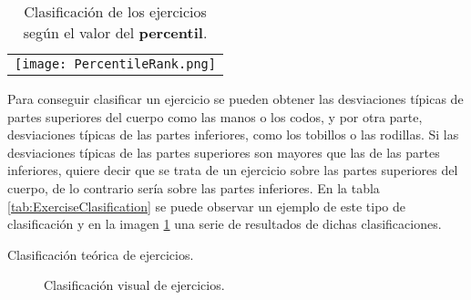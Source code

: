 \begin{table}[H]
    \centering
    \begin{tabular}{}
    \texttt{[image: PercentileRank.png]}
    \end{tabular}
    \caption{Clasificación de los ejercicios según el valor del \textbf{percentil}.}
    \label{tab:PercentileRank}
\end{table}

 Para conseguir clasificar un ejercicio se pueden obtener las desviaciones típicas de partes superiores del cuerpo como las manos o los codos, y por otra parte, desviaciones típicas de las partes inferiores, como los tobillos o las rodillas. Si las desviaciones típicas de las partes superiores son mayores que las de las partes inferiores, quiere decir que se trata de un ejercicio sobre las partes superiores del cuerpo, de lo contrario sería sobre las partes inferiores. En la tabla \ref{tab:ExerciseClasification} se puede observar un ejemplo de este tipo de clasificación y en la imagen \ref{f:prub} una serie de resultados de dichas clasificaciones.

\begin{table}[H]
 \centering
 \caption{Clasificación teórica de ejercicios.}
 \label{tab:ExerciseClasification}
\end{table}

\begin{figure}
 \centering
{}
      \vspace{1mm}
      \vspace{1mm}
 \caption{Clasificación visual de ejercicios.}
 \label{f:prub}
\end{figure}
\newpage


